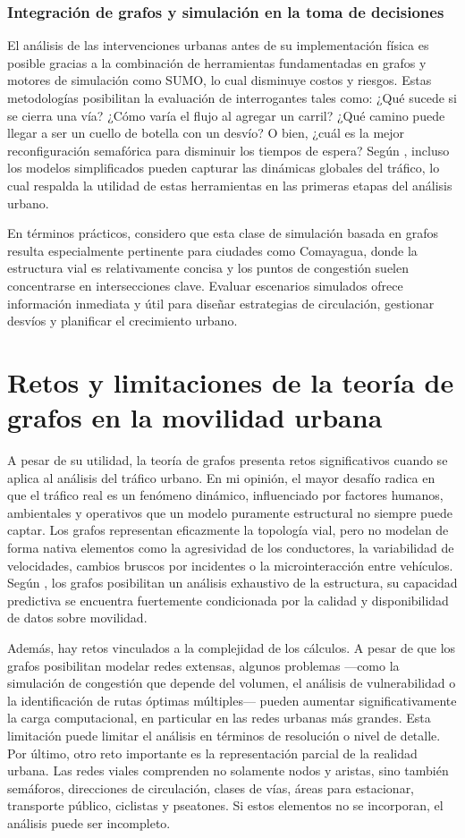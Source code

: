\subsubsection{Integración de grafos y simulación en la toma de decisiones}
El análisis de las intervenciones urbanas antes de su implementación física es posible gracias a la combinación de herramientas fundamentadas en grafos y motores de simulación 
como SUMO, lo cual disminuye costos y riesgos. Estas metodologías posibilitan la evaluación de interrogantes tales como: ¿Qué sucede si se cierra una vía? ¿Cómo varía el flujo 
al agregar un carril? ¿Qué camino puede llegar a ser un cuello de botella con un desvío? O bien, ¿cuál es la mejor reconfiguración semafórica para disminuir los tiempos de 
espera? Según \cite{nagel_cellular_1992}, incluso los modelos simplificados pueden capturar las dinámicas globales del tráfico, lo cual respalda la utilidad de estas herramientas en las primeras 
etapas del análisis urbano.

En términos prácticos, considero que esta clase de simulación basada en grafos resulta especialmente pertinente para ciudades como Comayagua, donde la estructura vial es 
relativamente concisa y los puntos de congestión suelen concentrarse en intersecciones clave. Evaluar escenarios simulados ofrece información inmediata y útil para diseñar 
estrategias de circulación, gestionar desvíos y planificar el crecimiento urbano.

\section{Retos y limitaciones de la teoría de grafos en la movilidad urbana}
A pesar de su utilidad, la teoría de grafos presenta retos significativos cuando se aplica al análisis del tráfico urbano. En mi opinión, el mayor desafío radica en que el 
tráfico real es un fenómeno dinámico, influenciado por factores humanos, ambientales y operativos que un modelo puramente estructural no siempre puede captar. Los grafos 
representan eficazmente la topología vial, pero no modelan de forma nativa elementos como la agresividad de los conductores, la variabilidad de velocidades, cambios bruscos 
por incidentes o la microinteracción entre vehículos. Según \cite{porta_network_2004}, los grafos posibilitan un análisis exhaustivo de la estructura, su capacidad predictiva se encuentra 
fuertemente condicionada por la calidad y disponibilidad de datos sobre movilidad.

Además, hay retos vinculados a la complejidad de los cálculos. A pesar de que los grafos posibilitan modelar redes extensas, algunos problemas —como la simulación de 
congestión que depende del volumen, el análisis de vulnerabilidad o la identificación de rutas óptimas múltiples— pueden aumentar significativamente la carga computacional, 
en particular en las redes urbanas más grandes. Esta limitación puede limitar el análisis en términos de resolución o nivel de detalle.
Por último, otro reto importante es la representación parcial de la realidad urbana. Las redes viales comprenden no solamente nodos y aristas, sino también semáforos, 
direcciones de circulación, clases de vías, áreas para estacionar, transporte público, ciclistas y pseatones. Si estos elementos no se incorporan, el análisis puede ser 
incompleto.
